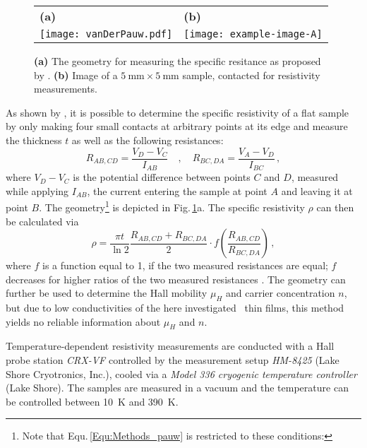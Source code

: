 \begin{figure}
    \centering
    \begin{tabular}{ll}
        \textbf{(a)} & \textbf{(b)} \\
        \texttt{[image: vanDerPauw.pdf]}
        & \texttt{[image: example-image-A]}
    \end{tabular}
    \caption{\textbf{(a)} The geometry for measuring the specific resitance as proposed by \textcite{pauw1958}. \textbf{(b)} Image of a $\qty{5}{\mm}\times\qty{5}{\mm}$ sample, contacted for resistivity measurements. \tbd}
    \label{Fig:Methods_pauwGeometry}
\end{figure}

As shown by \textcite{pauw1958}, it is possible to determine the specific resistivity of a flat sample by only making four small contacts at arbitrary points at its edge and measure the thickness $t$ as well as the following resistances:
\begin{equation}
    R_{AB,CD}=\frac{V_D-V_C}{I_{AB}}\quad , \quad
    R_{BC,DA}=\frac{V_A-V_D}{I_{BC}}\,,
\end{equation}
where $V_D-V_C$ is the potential difference between points $C$ and $D$, measured while applying $I_{AB}$, the current entering the sample at point $A$ and leaving it at point $B$.
The geometry\footnote{
    Note that Equ.\,\ref{Equ:Methods_pauw} is restricted to these conditions:
} is depicted in Fig.\,\ref{Fig:Methods_pauwGeometry}a.
The specific resistivity $\rho$ can then be calculated via
\begin{equation}
    \label{Equ:Methods_pauw}
    \rho=
    \frac{\pi t}{\ln2}
    \frac{R_{AB,CD}+R_{BC,DA}}{2}
    \cdot f\left(\frac{R_{AB,CD}}{R_{BC,DA}}\right)\,,
\end{equation}
where $f$ is a function equal to 1, if the two measured resistances are equal; $f$ decreases for higher ratios of the two measured resistances
    \cite{pauw1958}.
The geometry can further be used to determine the Hall mobility $\mu_H$ and carrier concentration $n$, but due to low conductivities of the here investigated \cro\ thin films, this method yields no reliable information about $\mu_H$ and $n$.

Temperature-dependent resistivity measurements are conducted with a Hall probe station \textit{CRX-VF} controlled by the measurement setup \textit{HM-8425} (Lake Shore Cryotronics, Inc.), cooled via a \textit{Model 336 cryogenic temperature controller} (Lake Shore).
The samples are measured in a vacuum and the temperature can be controlled between \qty{10}{\kelvin} and \qty{390}{\kelvin}.